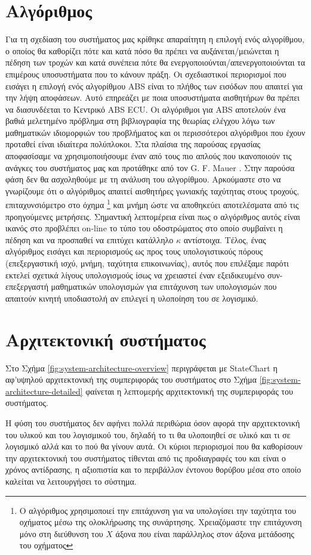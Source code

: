 \documentclass{article}
\begin{document}
\section{Αλγόριθμος}
Για τη σχεδίαση του συστήματος μας κρίθηκε απαραίτητη η επιλογή ενός αλγορίθμου, ο οποίος θα καθορίζει πότε και κατά πόσο θα πρέπει να αυξάνεται/μειώνεται η πέδηση των τροχών και κατά συνέπεια πότε θα ενεργοποιούνται/απενεργοποιούνται τα επιμέρους υποσυστήματα που το κάνουν πράξη. Οι σχεδιαστικοί περιορισμοί που εισάγει η επιλογή ενός αλγορίθμου ABS είναι το πλήθος των εισόδων που απαιτεί για την λήψη αποφάσεων. Αυτό επηρεάζει με ποια υποσυστήματα αισθητήρων θα πρέπει να διασυνδέεται το Κεντρικό ABS ECU. Οι αλγόριθμοι για ABS αποτελούν ένα βαθιά μελετημένο πρόβλημα στη βιβλιογραφία της θεωρίας ελέγχου λόγω των μαθηματικών ιδιομορφιών του προβλήματος και οι περισσότεροι αλγόριθμοι που έχουν προταθεί είναι ιδιαίτερα πολύπλοκοι. Στα πλαίσια της παρούσας εργασίας αποφασίσαμε να χρησιμοποιήσουμε έναν από τους πιο απλούς που ικανοποιούν τις ανάγκες του συστήματος μας και προτάθηκε από τον G. F. Mauer \cite{481947}. Στην παρούσα φάση δεν θα ασχοληθούμε με τη ανάλυση του αλγορίθμου. Αρκούμαστε στο να γνωρίζουμε ότι ο αλγόριθμος απαιτεί αισθητήρες γωνιακής ταχύτητας στους τροχούς, επιταχυνσιόμετρο στο όχημα \footnote{Ο αλγόριθμος χρησιμοποιεί την επιτάχυνση για να υπολογίσει την ταχύτητα του οχήματος μέσω της ολοκλήρωσης της συνάρτησης. Χρειαζόμαστε την επιτάχυνση μόνο στη διεύθυνση του $Χ$ άξονα που είναι παράλληλος στον άξονα μετάδοσης του οχήματος } και μνήμη ώστε να αποθηκεύει αποτελέσματα από τις προηγούμενες μετρήσεις. Σημαντική λεπτομέρεια είναι πως ο αλγόριθμος αυτός είναι ικανός στο προβλέπει on-line το τύπο του οδοστρώματος στο οποίο συμβαίνει η πέδηση και να προσπαθεί να επιτύχει κατάλληλο $\kappa$ αντίστοιχα. Τέλος, ένας αλγόριθμος εισάγει και περιορισμούς ως προς τους υπολογιστικούς πόρους (επεξεργαστική ισχύ, μνήμη, ταχύτητα επικοινωνίας), αυτός που επιλέξαμε παρότι εκτελεί σχετικά λίγους υπολογισμούς ίσως να χρειαστεί έναν εξειδικευμένο συν-επεξεργαστή μαθηματικών υπολογισμών για επιτάχυνση των υπολογισμών που απαιτούν κινητή υποδιαστολή αν επιλεγεί η υλοποίηση του σε λογισμικό.

\section{Αρχιτεκτονική συστήματος}
Στο Σχήμα \ref{fig:system-architecture-overview} περιγράφεται με StateChart \cite{10.1016/0167-6423(87)90035-9} η αφ'υψηλού  αρχιτεκτονική της συμπεριφοράς του συστήματος στο Σχήμα \ref{fig:system-architecture-detailed} φαίνεται η λεπτομερής αρχιτεκτονική της συμπεριφοράς του συστήματος.
\par
Η φύση του συστήματος δεν αφήνει πολλά περιθώρια όσον αφορά την αρχιτεκτονική του υλικού και του λογισμικού του, δηλαδή το τι θα υλοποιηθεί σε υλικό και τι σε λογισμικό αλλά και το πού θα γίνουν αυτά. Οι κύριοι περιορισμοί που θα καθορίσουν την αρχιτεκτονική του συστήματος τίθενται από τις προδιαγραφές του και είναι ο χρόνος αντίδρασης, η αξιοπιστία και το περιβάλλον έντονου θορύβου μέσα στο οποίο καλείται να λειτουργήσει το σύστημα.
\end{document}
